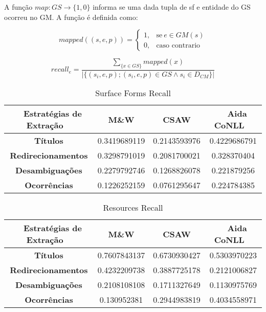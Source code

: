 \documentclass[10pt,a4paper]{llncs}
\begin{document}
{\begin{itemize}
A função $map : GS \rightarrow \{1,0\}$ informa se uma dada tupla de sf e entidade do GS ocorreu no GM. A função é definida como:

\begin{equation}
mapped((s,e,p)) = \left\{\begin{matrix}
    1,& \text{se} ~ e \in GM(s)\\ 
    0,& \text{caso contrario}
\end{matrix}\right.
\end{equation}

\[  recall_e = \frac{ \sum_{ \{x \in GS\} } mapped(x) }{ |\{ (s_i, e, p); (s_i, e, p) \in GS \wedge s_i \in D_{CM} \}| }  \]

\end{itemize}

\begin{table} \label{tab-sfRecall}
\caption{Surface Forms Recall}
\centering
    \begin{tabular}{|c|c|c|c|}
    \hline
    ~ {\bf Estratégias de Extração} ~ 	& ~ {\bf M\&W} ~ 	& ~ {\bf CSAW} ~ 	& ~ {\bf Aida CoNLL} ~\\ \hline  
    {\bf Títulos} 			& 0.3419689119			& 0.2143593976			& 0.4229686791 \\ \hline
    {\bf Redirecionamentos} 		& 0.3298791019			& 0.2081700021			& 0.328370404 \\ \hline
    {\bf Desambiguações} 		& 0.2279792746			& 0.1268826078			& 0.221879256 \\ \hline
    {\bf Ocorrências} 			& 0.1226252159			& 0.0761295647			& 0.224784385 \\ \hline
    \end{tabular}
\end{table}

\begin{table} \label{tab-resourcesRecall}
\caption{Resources Recall}
\centering
    \begin{tabular}{|c|c|c|c|}
    \hline
    ~ {\bf Estratégias de Extração} ~ 	& ~ {\bf M\&W} ~ 	& ~ {\bf CSAW} ~ 	& ~ {\bf Aida CoNLL} ~\\ \hline  
    {\bf Títulos} 			& 0.7607843137			& 0.6730930427			& 0.5303970223 \\ \hline
    {\bf Redirecionamentos} 		& 0.4232209738			& 0.3887725178			& 0.2121006827 \\ \hline
    {\bf Desambiguações} 		& 0.2108108108			& 0.1711327649			& 0.1130975769 \\ \hline
    {\bf Ocorrências} 			& 0.130952381			& 0.2944983819			& 0.4034558971 \\ \hline
    \end{tabular}
\end{table}


}
\end{document}
